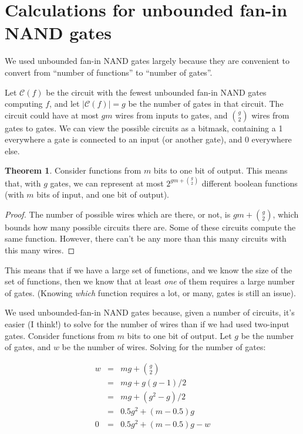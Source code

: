 \documentclass[12pt]{article}
\theoremstyle{definition}
\newtheorem{thm}{Theorem}[section]
\newcommand{\bigC}[0]{\mathcal{C}}
\begin{document}
\appendix
\section{Calculations for unbounded fan-in NAND gates}
\label{gateMath}

We used unbounded fan-in NAND gates largely because they are
convenient to convert from ``number of functions'' to
``number of gates''.

Let $\bigC(f)$ be the circuit
with the fewest unbounded fan-in NAND
gates computing $f$, and let $|\bigC(f)| = g$ be the number of gates in
that circuit. The
circuit could have at most $gm$ wires from inputs to gates, and ${g \choose 2}$
wires from gates to gates. We can view the possible circuits as a bitmask,
containing a 1 everywhere a gate is connected to an input (or another gate),
and 0 everywhere else.

\begin{thm}
\label{boundFromCounting}
Consider functions from $m$ bits to one bit of output.
This means that, with $g$ gates, we can represent at most
$2^{gm + {g \choose 2}}$ different boolean functions (with $m$ bits of input,
and one bit of output).
\end{thm}
\begin{proof}

The number of possible wires which are there, or not, is $gm + {g \choose 2}$,
which bounds how many possible circuits there are.
Some of these circuits compute the same function.
However, there can't be any more than this many circuits with this many wires.
\end{proof}

This means that if we have a large set of functions, and we know the size of
the set of functions, then we know that at least {\em one} of them requires
a large number of gates. (Knowing {\em which} function requires a lot, or many,
gates is still an issue).

We used unbounded-fan-in NAND gates because, given a number of circuits,
it's easier (I think!) to solve for the number of wires than if we had
used two-input gates.
Consider functions from $m$ bits to one bit of output.
Let $g$ be the number of gates, and $w$ be the number of wires.
Solving for the number of gates:

\begin{eqnarray*}
w & = & mg + {g \choose 2} \\
  & = & mg + g(g-1)/2 \\
  & = & mg + (g^2 - g) / 2 \\
  & = & 0.5g^2 + (m-0.5)g \\
0 & = & 0.5g^2 + (m-0.5)g - w \\
\end{eqnarray*}
\end{document}
